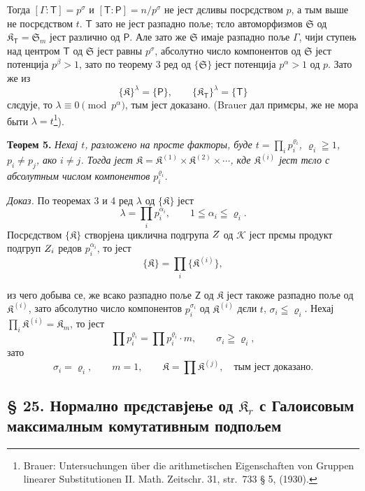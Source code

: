 \documentclass[11pt]{article}
\newcommand{\srcfn}[2]{\footnote{#2}}
\newcommand{\foreign}[1]{#1}
\begin{document}
Тогда \([\Gamma:\mathsf{T}]=p^\sigma\) и \([\mathsf{T}:\mathsf P]=n/p^\sigma\) не јест дєливы посрєдством \(p\), а тым выше не посрєдством \(t\). \(\mathsf{T}\) зато не јест разпадно поље; тєло автоморфизмов \(\mathfrak S\) од \(\mathfrak K_{\mathsf{T}}=\mathfrak S_m\) јест различно од \(\mathsf P\). Але зато же \(\mathfrak S\) имаје разпадно поље \(\Gamma\), чији ступењ над центром \(\mathsf{T}\) од \(\mathfrak S\) јест равны \(p^\sigma\), абсолутно число компонентов од \(\mathfrak S\) јест потенција \(p^\beta>1\), зато по теорему 3 ред од \(\{\mathfrak S\}\) јест потенција \(p^\alpha>1\) од \(p\). Зато же из
\[
\{\mathfrak K\}^{\lambda}=\{\mathsf P\},
\qquad
\{\mathfrak K_{\mathsf{T}}\}^{\lambda}=\{\mathsf{T}\}
\]
слєдује, то \(\lambda\equiv0\pmod {p^\alpha}\), тым јест доказано. (Brauer дал примєры, же не мора быти \(\lambda=t\)\srcfn{1}{\foreign{Brauer: Untersuchungen über die arithmetischen Eigenschaften von Gruppen linearer Substitutionen II. Math. Zeitschr. 31, str.~733 § 5, (1930).}}).

\textbf{Теорем 5.} \emph{Нехај \(t\), разложено на просте факторы, буде \(t=\prod_i p_i^{\varrho_i}\), \(\varrho_i\geqq1\), \(p_i\ne p_j\), ако \(i\ne j\). Тогда јест \(\mathfrak K=\mathfrak K^{(1)}\times\mathfrak K^{(2)}\times\cdots\), кде \(\mathfrak K^{(i)}\) јест тєло с абсолутным числом компонентов \(p_i^{\varrho_i}\).}

\emph{Доказ.} По теоремах 3 и 4 ред \(\lambda\) од \(\{\mathfrak K\}\) јест
\[
\lambda=\prod_i p_i^{\alpha_i},\qquad 1\leqq\alpha_i\leqq\varrho_i.
\]
Посрєдством \(\{\mathfrak K\}\) створјена циклична подгрупа \(\mathscr \mathsf{Z}\) од \(\mathscr K\) јест прємы продукт подгруп \(\mathscr \mathsf{Z}_i\) редов \(p_i^{\alpha_i}\), то јест
\[
\{\mathfrak K\}=\prod_i\{\mathfrak K^{(i)}\},
\]

из чего добыва се, же всако разпадно поље \(\mathsf{Z}\) од \(\mathfrak K\) јест такоже разпадно поље од \(\mathfrak K^{(i)}\), зато абсолутно число компонентов \(p_i^{\sigma_i}\) од \(\mathfrak K^{(i)}\) дєли \(t\), \(\sigma_i\leqq\varrho_i\). Нехај \(\prod_i \mathfrak K^{(i)}=\mathfrak K_m\), то јест
\[
\prod p_i^{\varrho_i}=\prod p_i^{\varrho_i}\cdot m,
\qquad
\sigma_i\geqq\varrho_i,
\]
зато
\[
\sigma_i=\varrho_i,\qquad m=1,\qquad
\mathfrak K=\prod \mathfrak K^{(j)},
\quad\text{тым јест доказано.}
\]

\subsection*{§ 25. Нормално прєдставјење од \(\mathfrak K_r\) с Галоисовым максималным комутативным подпољем\protect\footnotemark}
\label{normaldarstellung-von-r_r-mit-galoisschem-maximalem-kommutativem-teilkoerper-1}
\end{document}
